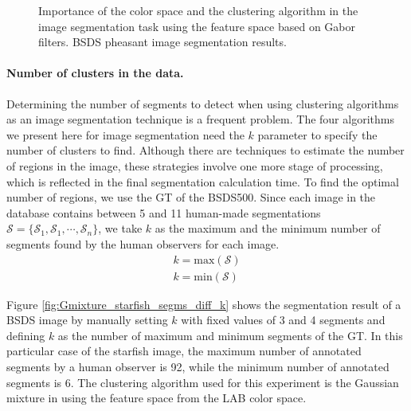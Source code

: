 \begin{figure}[!ht]
	\caption{Importance of the color space and the clustering algorithm in the image segmentation task using the feature space based on Gabor filters. BSDS pheasant image segmentation results.}\label{fig:pheasant_clustering_method_v_colorspace}    
\end{figure}



\paragraph{Number of clusters in the data.} 
Determining the number of segments to detect when using clustering algorithms as an image segmentation technique is a frequent problem. The four algorithms we present here for image segmentation need the $k$ parameter to specify the number of clusters to find. Although there are techniques to estimate the number of regions in the image, these strategies involve one more stage of processing, which is reflected in the final segmentation calculation time. To find the optimal number of regions, we use the GT of the BSDS500. Since each image in the database contains between 5 and 11 human-made segmentations $\mathcal{S}=\{\mathcal{S}_1, \mathcal{S}_1, \cdots, \mathcal{S}_n\}$, we take $k$ as the maximum and the minimum number of segments found by the human observers for each image. 
\begin{eqnarray}
	k = \mathrm{max}(\mathcal{S}) \\
	k = \mathrm{min}(\mathcal{S})
\end{eqnarray}

Figure \ref{fig:Gmixture_starfish_segms_diff_k} shows the segmentation result of a BSDS image by manually setting $k$ with fixed values of 3 and 4 segments and defining $k$ as the number of maximum and minimum segments of the GT. In this particular case of the starfish image, the maximum number of annotated segments by a human observer is 92, while the minimum number of annotated segments is 6. The clustering algorithm used for this experiment is the Gaussian mixture in using the feature space from the LAB color space.


